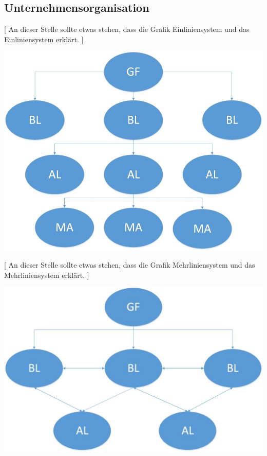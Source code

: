 
\subsection{Unternehmensorganisation}

[ An dieser Stelle sollte etwas stehen, dass die Grafik Einliniensystem und das Einliniensystem erklärt. ]

\includegraphics[scale=0.3]{pictures/lf02-pic/lf02-einliniensystem.jpg}

[ An dieser Stelle sollte etwas stehen, dass die Grafik Mehrliniensystem und das Mehrliniensystem erklärt. ]

\includegraphics[scale=0.3]{pictures/lf02-pic/lf02-mehrliniensystem.jpg}

